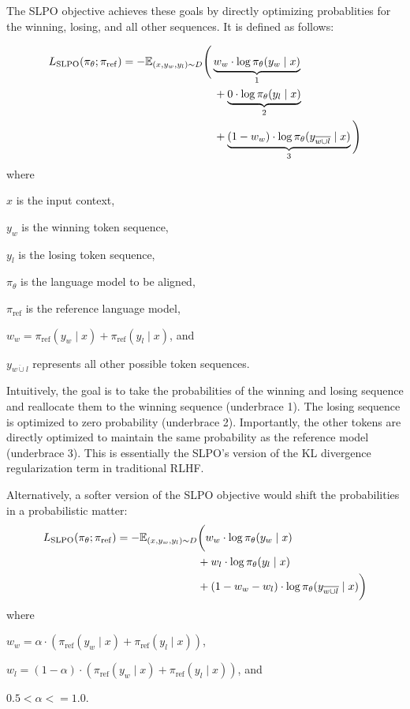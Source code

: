 \documentclass[twoside,11pt]{article}
\begin{document}
The SLPO objective achieves these goals
by directly optimizing probablities for the winning, losing,
and all other sequences. It is defined as follows:

\begin{align}
  \label{eq:slpo}
  L_\mathrm{SLPO}(\pi_\theta; \pi_\mathrm{ref}) =
  -\mathbb{E}_{(x, y_w, y_l) \sim D} &\Bigg(
    \underbrace{
      w_w \cdot \log \pi_\theta(y_w \mid x)
    }_{1} \notag \\
    &\quad +
    \underbrace{
      0 \cdot \log \pi_\theta(y_l \mid x)
    }_{2} \notag \\
    &\quad +
    \underbrace{
      (1 - w_w) \cdot \log \pi_\theta(y_{\overline{w \cup l}} \mid x)
    }_{3}
  \Bigg)
\end{align}
where 
\begin{description}
  \item $x$ is the input context,
  \item $y_w$ is the winning token sequence,
  \item $y_l$ is the losing token sequence,
  \item $\pi_\theta$ is the language model to be aligned,
  \item $\pi_\mathrm{ref}$ is the reference language model,
  \item $w_w = \pi_\mathrm{ref}(y_w \mid x) + \pi_\mathrm{ref}(y_l \mid x)$, and
  \item $y_{\overline{w \cup l}}$ represents all other possible token sequences.
\end{description}

Intuitively, the goal is to take the probabilities of the winning
and losing sequence and reallocate them to the winning sequence (underbrace 1).
The losing sequence is optimized to zero probability (underbrace 2). 
Importantly,
the other tokens are directly optimized to maintain 
the same probability as the reference model  (underbrace 3). 
This is essentially the SLPO's version of
the KL divergence regularization term in traditional RLHF. 

Alternatively, a softer version of the SLPO objective 
would shift the probabilities in a probabilistic matter: 
\begin{align}
  L_\mathrm{SLPO}(\pi_\theta; \pi_\mathrm{ref}) =
  -\mathbb{E}_{(x, y_w, y_l) \sim D} &\bigg(
    w_w \cdot \log \pi_\theta(y_w \mid x)  \notag \\
    &+ w_l \cdot \log \pi_\theta(y_l \mid x)  \notag \\
    &+ (1 - w_w - w_l) \cdot \log \pi_\theta(y_{\overline{w \cup l}} \mid x)
  \bigg)
\end{align}
where
\begin{description}
  \item $w_w = \alpha \cdot \left( \pi_\mathrm{ref}(y_w \mid x) + \pi_\mathrm{ref}(y_l \mid x) \right)$, 
  \item $w_l = (1 - \alpha) \cdot \left( \pi_\mathrm{ref}(y_w \mid x) + \pi_\mathrm{ref}(y_l \mid x) \right)$, and
  \item $0.5 < \alpha <= 1.0$.
\end{description}
\end{document}
